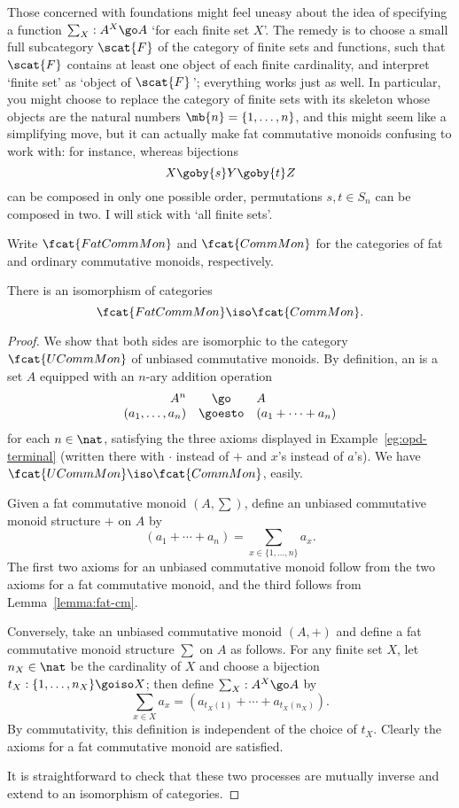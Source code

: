 Those concerned with foundations might feel uneasy about the idea of
specifying a function $\sum_X: A^X \go A$ `for each finite%
%
%
set $X$'.  The remedy is to choose a small full subcategory $\scat{F}$ of
the category of finite sets and functions, such that $\scat{F}$ contains at
least one object of each finite cardinality, and interpret `finite set' as
`object of $\scat{F}\,$'; everything works just as well.  In particular,
you might choose to replace the category of finite sets with its skeleton
whose objects are the natural numbers $\mb{n} = \{1, \ldots, n\}$, and this
might seem like a simplifying move, but it can actually make fat
commutative monoids confusing to work with: for instance, whereas
bijections
\[
X \goby{s} Y \goby{t} Z
\]
can be composed in only one possible order, permutations $s, t \in S_n$ can
be composed in two.  I will stick with `all finite sets'.

Write $\fcat{FatCommMon}$%
% 
% 
and $\fcat{CommMon}$ for the categories of fat
and ordinary commutative monoids, respectively.

\begin{thm}	
There is an isomorphism of categories 
\[
\fcat{FatCommMon} \iso
\fcat{CommMon}.
\]
\end{thm}
%
\begin{proof}
We show that both sides are isomorphic to the category $\fcat{UCommMon}$ of
unbiased commutative monoids.  By definition, an %
%
%
is a set $A$ equipped with an $n$-ary addition
operation
\[
\begin{array}{rcl}
A^n			&\go		&A			\\
(a_1, \ldots, a_n)	&\goesto	&(a_1 + \cdots + a_n)
\end{array}
\]
for each $n\in\nat$, satisfying the three axioms displayed in
Example~\ref{eg:opd-terminal} (written there with $\cdot$ instead of $+$
and $x$'s instead of $a$'s).  We have $\fcat{UCommMon} \iso
\fcat{CommMon}$, easily.

Given a fat commutative monoid $(A, \sum)$, define an unbiased
commutative monoid structure $+$ on $A$ by
\[
(a_1 + \cdots + a_n) 
= 
\sum_{x\in \{1, \ldots, n\} } a_x.
\]
The first two axioms for an unbiased commutative monoid follow from the two
axioms for a fat commutative monoid, and the third follows from
Lemma~\ref{lemma:fat-cm}.

Conversely, take an unbiased commutative monoid $(A,+)$ and define a fat
commutative monoid structure $\sum$ on $A$ as follows.  For any finite set
$X$, let $n_X\in\nat$ be the cardinality of $X$ and choose a bijection $t_X:
\{1, \ldots, n_X\} \goiso X$; then define $\sum_X: A^X \go A$ by
\[
\sum_{x\in X} a_x = (a_{t_X(1)} + \cdots + a_{t_X(n_X)}).
\]
By commutativity, this definition is independent of the choice of $t_X$.
Clearly the axioms for a fat commutative monoid are satisfied.

It is straightforward to check that these two processes are mutually
inverse and extend to an isomorphism of categories.
\done
\end{proof}%
%
%



